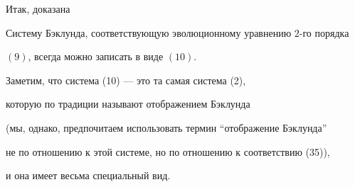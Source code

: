 Итак, доказана





\begin{thms}


Систему Бэклунда, соответствующую эволюционному уравнению $2$-го порядка


$(9)$, всегда можно записать в виде $(10)$.


\end{thms}





Заметим, что система (10) --- это та самая система (2), 


которую по традиции называют отображением Бэклунда 


(мы, однако, предпочитаем использовать термин ``отображение Бэклунда'' 


не по отношению к этой системе, но по отношению к соответствию (35)), 


и она имеет весьма специальный вид.





